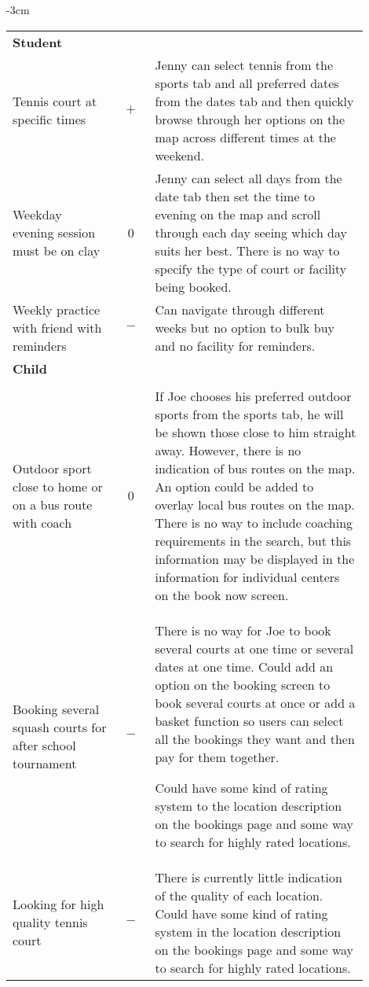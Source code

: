\begin{center}
\begin{adjustwidth*}{}{-3cm}
\begin{longtable}{@{\extracolsep{\fill}}p{0.3\linewidth} c p{0.6\linewidth}}
		\midrule
		\multicolumn{3}{l}{\textbf{Student}}\\
		\cmidrule(r){1-3}
		Tennis court at specific times & $+$ & Jenny can select tennis from the
		sports tab and all preferred dates from the dates tab and then quickly
		browse through her options on the map across different times at the
		weekend.\\

		Weekday evening session must be on clay & 0 & Jenny can select all
		days from the date tab then set the time to evening on the map and
		scroll through each day seeing which day suits her best. There is no
		way to specify the type of court or facility being booked.\\

		Weekly practice with friend with reminders & $-$ & Can navigate
		through different weeks but no option to bulk buy and no facility for
		reminders.\\

		\midrule
		\multicolumn{3}{l}{\textbf{Child}}\\
		\cmidrule(r){1-3}\\
		Outdoor sport close to home or on a bus route with
		coach & 0 & If Joe chooses his preferred outdoor sports from the sports
		tab, he will be shown those close to him straight away. However, there
		is no indication of bus routes on the map. An option could be added to
		overlay local bus routes on the map. There is no way to include
		coaching requirements in the search, but this information may be
		displayed in the information for individual centers on the book now
		screen.\\

		Booking several squash courts for after school tournament & $-$ &
		There is no way for Joe to book several courts at one time or several
		dates at one time. Could add an option on the booking screen to book
		several courts at once or add a basket function so users can select all
		the bookings they want and then pay for them together.

		Could have some kind of rating system to the location description on
		the bookings page and some way to search for highly rated locations.\\

		Looking for high quality tennis court & $-$ & There is currently
		little indication of the quality of each location. Could have some
		kind of rating system in the location description on the bookings page
		and some way to search for highly rated locations.\\
		\bottomrule
	\end{longtable}
	\end{adjustwidth*}
\end{center}
